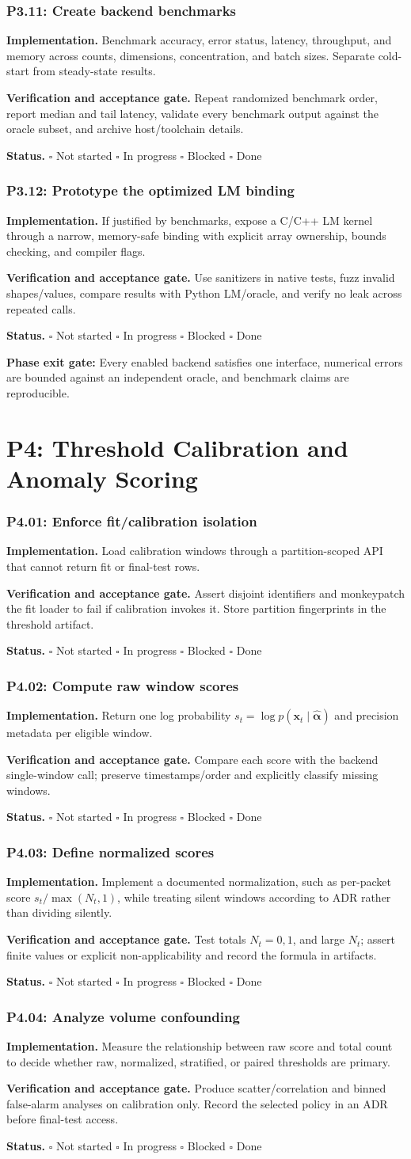 \documentclass[11pt,a4paper]{article}
\newcommand{\status}{\(\square\) Not started \quad \(\square\) In progress \quad \(\square\) Blocked \quad \(\square\) Done}
\newcommand{\task}[4]{%
  \subsubsection{#1: #2}
  \textbf{Implementation.} #3

  \textbf{Verification and acceptance gate.} #4

  \textbf{Status.} \status
}
\newcommand{\gate}[1]{\textcolor{blue!45!black}{\textbf{Phase exit gate:} #1}}
\begin{document}
\task{P3.11}{Create backend benchmarks}{Benchmark accuracy, error status, latency, throughput, and memory across counts, dimensions, concentration, and batch sizes. Separate cold-start from steady-state results.}{Repeat randomized benchmark order, report median and tail latency, validate every benchmark output against the oracle subset, and archive host/toolchain details.}

\task{P3.12}{Prototype the optimized LM binding}{If justified by benchmarks, expose a C/C++ LM kernel through a narrow, memory-safe binding with explicit array ownership, bounds checking, and compiler flags.}{Use sanitizers in native tests, fuzz invalid shapes/values, compare results with Python LM/oracle, and verify no leak across repeated calls.}

\gate{Every enabled backend satisfies one interface, numerical errors are bounded against an independent oracle, and benchmark claims are reproducible.}

\section{P4: Threshold Calibration and Anomaly Scoring}

\task{P4.01}{Enforce fit/calibration isolation}{Load calibration windows through a partition-scoped API that cannot return fit or final-test rows.}{Assert disjoint identifiers and monkeypatch the fit loader to fail if calibration invokes it. Store partition fingerprints in the threshold artifact.}

\task{P4.02}{Compute raw window scores}{Return one log probability \(s_t=\log p(\mathbf{x}_t\mid\hat{\boldsymbol{\alpha}})\) and precision metadata per eligible window.}{Compare each score with the backend single-window call; preserve timestamps/order and explicitly classify missing windows.}

\task{P4.03}{Define normalized scores}{Implement a documented normalization, such as per-packet score \(s_t/\max(N_t,1)\), while treating silent windows according to ADR rather than dividing silently.}{Test totals \(N_t=0,1\), and large \(N_t\); assert finite values or explicit non-applicability and record the formula in artifacts.}

\task{P4.04}{Analyze volume confounding}{Measure the relationship between raw score and total count to decide whether raw, normalized, stratified, or paired thresholds are primary.}{Produce scatter/correlation and binned false-alarm analyses on calibration only. Record the selected policy in an ADR before final-test access.}
\end{document}
